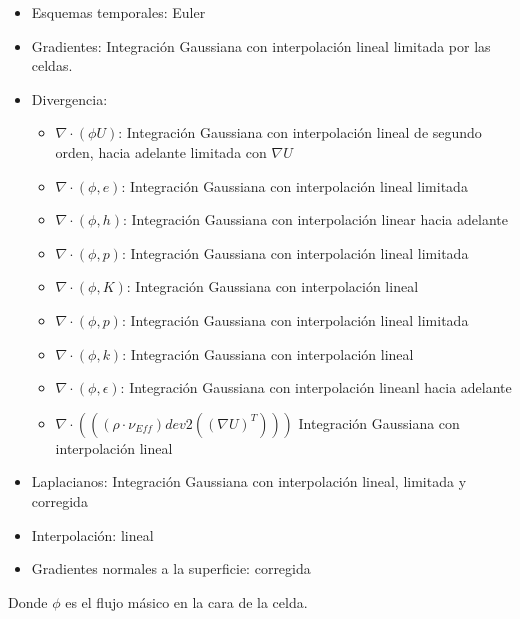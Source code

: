 \begin{itemize}
        \item Esquemas temporales: Euler
        \item Gradientes: Integración Gaussiana con interpolación lineal limitada por las celdas.
        \item Divergencia:
        \begin{itemize}
                \item $\nabla \cdot (\phi U)$: Integración Gaussiana con interpolación lineal de segundo orden, hacia adelante limitada con $\nabla U$
                \item $\nabla \cdot (\phi,e)$: Integración Gaussiana con interpolación lineal limitada
                \item $\nabla \cdot (\phi,h)$: Integración Gaussiana con interpolación linear hacia adelante
                \item $\nabla \cdot (\phi,p)$: Integración Gaussiana con interpolación lineal limitada
                \item $\nabla \cdot (\phi,K)$: Integración Gaussiana con interpolación lineal
                \item $\nabla \cdot (\phi,p)$: Integración Gaussiana con interpolación lineal limitada
                \item $\nabla \cdot (\phi,k)$: Integración Gaussiana con interpolación lineal
                \item $\nabla \cdot (\phi,\epsilon)$: Integración Gaussiana con interpolación lineanl hacia adelante
                \item $\nabla \cdot (((\rho\cdot \nu_{Eff}) dev2((\nabla U)^{T})))$ Integración Gaussiana con interpolación lineal
        \end{itemize}
        \item Laplacianos: Integración Gaussiana con interpolación lineal, limitada y corregida
        \item Interpolación: lineal
        \item Gradientes normales a la superficie: corregida
\end{itemize}

Donde $\phi$ es el flujo másico en la cara de la celda.

%


